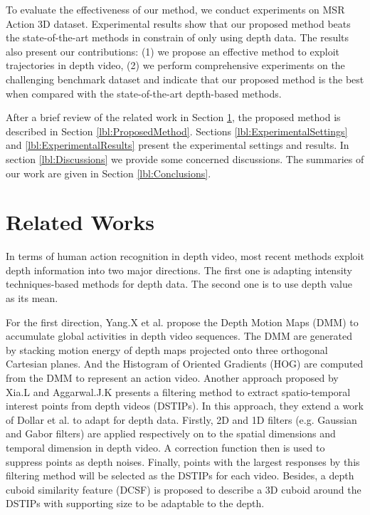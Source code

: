 \documentclass[review]{elsarticle}
\begin{document}
To evaluate the effectiveness of our method, we conduct experiments on MSR Action 3D dataset. Experimental results show that our proposed method beats the state-of-the-art methods in constrain of only using depth data. The results also present our contributions: (1) we propose an effective method to exploit trajectories in depth video, (2) we perform comprehensive experiments on the challenging benchmark dataset and indicate that our proposed method is the best when compared with the state-of-the-art depth-based methods.

After a brief review of the related work in Section \ref{lbl:RelatedWorks}, the proposed method is described in Section \ref{lbl:ProposedMethod}. Sections \ref{lbl:ExperimentalSettings} and \ref{lbl:ExperimentalResults} present the experimental settings and results. In section \ref{lbl:Discussions} we provide some concerned discussions. The summaries of our work are given in Section \ref{lbl:Conclusions}.

\section{Related Works}
\label{lbl:RelatedWorks}

In terms of human action recognition in depth video, most recent methods exploit depth information into two major directions. The first one is adapting intensity techniques-based methods for depth data. The second one is to use depth value as its mean.

For the first direction, Yang.X et al. \cite{yang2012recognizing} propose the Depth Motion Maps (DMM) to accumulate global activities in depth video sequences. The DMM are generated by stacking motion energy of depth maps projected onto three orthogonal Cartesian planes. And the Histogram of Oriented Gradients (HOG) \cite{dalal2005histograms} are computed from the DMM to represent an action video. Another approach proposed by Xia.L and Aggarwal.J.K \cite{xia2013spatio} presents a filtering method to extract spatio-temporal interest points from depth videos (DSTIPs). In this approach, they extend a work of Dollar et al. \cite{dollar2005behavior} to adapt for depth data. Firstly, 2D and 1D filters (e.g. Gaussian and Gabor filters) are applied respectively on to the spatial dimensions and temporal dimension in depth video. A correction function then is used to suppress points as depth noises. Finally, points with the largest responses by this filtering method will be selected as the DSTIPs for each video. Besides, a depth cuboid similarity feature (DCSF) is proposed to describe a 3D cuboid around the DSTIPs with supporting size to be adaptable to the depth.
\end{document}
